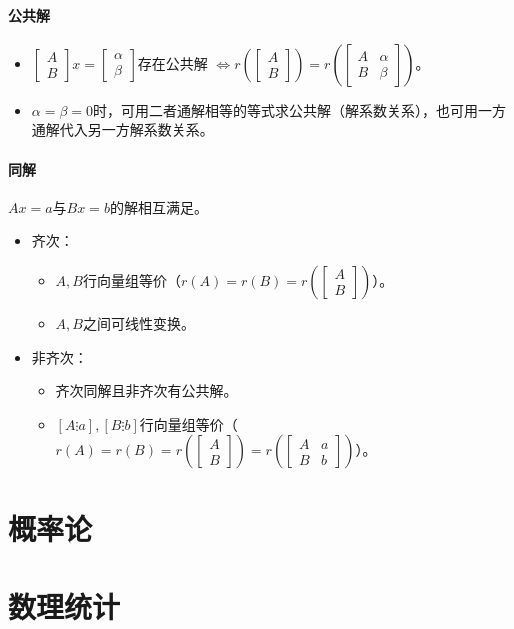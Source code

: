 \documentclass[
12pt, %
a4paper, 
oneside, %
headinclude,footinclude, %
]{scrartcl}
\begin{document}
\paragraph{公共解}
\begin{itemize}
\item $ \begin{bmatrix} A \\ B \end{bmatrix} x = \begin{bmatrix} \alpha \\ \beta \end{bmatrix} $存在公共解
$ \Leftrightarrow $$ r(\begin{bmatrix} A \\ B \end{bmatrix}) = r(\begin{bmatrix} A & \alpha \\ B & \beta \end{bmatrix}) $。
\item $ \alpha = \beta = 0 $时，可用二者通解相等的等式求公共解（解系数关系），也可用一方通解代入另一方解系数关系。
\end{itemize}
\paragraph{同解}
$ Ax = a $与$ Bx = b $的解相互满足。
\begin{itemize}
\item 齐次：
\begin{itemize}
\item $ A,B $行向量组等价（$ r(A) = r(B) = r(\begin{bmatrix} A \\ B \end{bmatrix}) $）。
\item $ A,B $之间可线性变换。
\end{itemize}
\item 非齐次：
\begin{itemize}
\item 齐次同解且非齐次有公共解。
\item $ [A \vdots a],[B \vdots b] $行向量组等价（$ r(A) = r(B) = r(\begin{bmatrix} A \\ B \end{bmatrix}) = r(\begin{bmatrix} A & a \\ B & b \end{bmatrix}) $）。
\end{itemize}
\end{itemize}
\section{概率论}
\section{数理统计}
\end{document}
